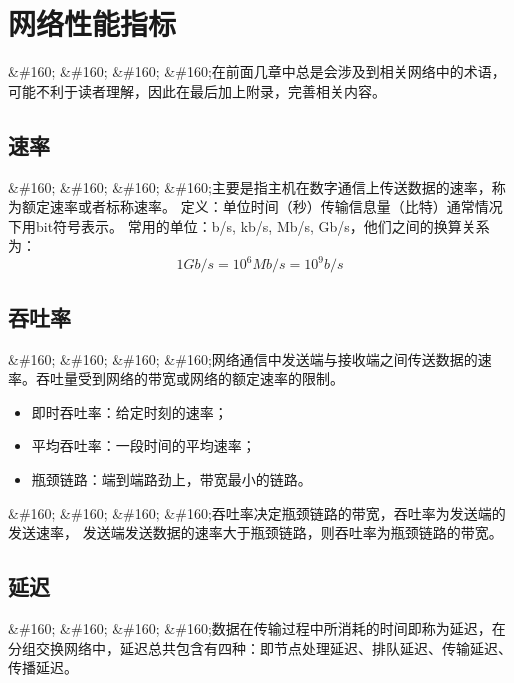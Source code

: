 \chapter{网络性能指标}
\label{网络性能指标}

\&\#160; \&\#160; \&\#160; \&\#160;在前面几章中总是会涉及到相关网络中的术语，可能不利于读者理解，因此在最后加上附录，完善相关内容。

\section{速率}
\label{速率}

\&\#160; \&\#160; \&\#160; \&\#160;主要是指主机在数字通信上传送数据的速率，称为额定速率或者标称速率。
定义：单位时间（秒）传输信息量（比特）通常情况下用bit符号表示。
常用的单位：b\slash s, kb\slash s, Mb\slash s, Gb\slash s，他们之间的换算关系为：
$$1Gb/s = 10^6 Mb/s = 10^9 b/s$$

\section{吞吐率}
\label{吞吐率}

\&\#160; \&\#160; \&\#160; \&\#160;网络通信中发送端与接收端之间传送数据的速率。吞吐量受到网络的带宽或网络的额定速率的限制。

\begin{itemize}
\item 即时吞吐率：给定时刻的速率；

\item 平均吞吐率：一段时间的平均速率；

\item 瓶颈链路：端到端路劲上，带宽最小的链路。

\end{itemize}

\&\#160; \&\#160; \&\#160; \&\#160;吞吐率决定瓶颈链路的带宽，吞吐率为发送端的发送速率， 发送端发送数据的速率大于瓶颈链路，则吞吐率为瓶颈链路的带宽。

\section{延迟}
\label{延迟}

\&\#160; \&\#160; \&\#160; \&\#160;数据在传输过程中所消耗的时间即称为延迟，在分组交换网络中，延迟总共包含有四种：即节点处理延迟、排队延迟、传输延迟、传播延迟。

